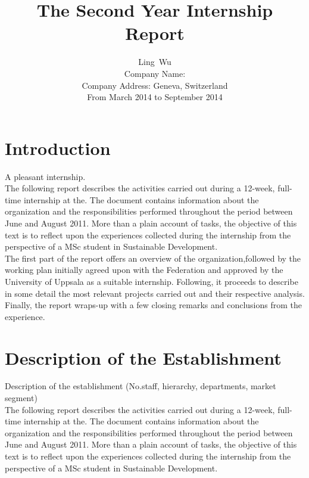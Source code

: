 \documentclass[12pt,onecolumn]{IEEEtran}
\begin{document}
\linespread{1.5}
\title{The Second Year Internship Report}
\author{Ling~Wu\\
  Company Name:\\
  Company Address: Geneva, Switzerland\\
  From March 2014 to September 2014\\}
\maketitle

\IEEEpeerreviewmaketitle
\thispagestyle{empty}
\newpage

\tableofcontents
\thispagestyle{empty}

\newpage

\clearpage
{} 
\section{\textbf{Introduction}}

A pleasant internship.\\

The following report describes the activities carried out during a 12-week, full-time internship at the. The document contains information about the organization and the responsibilities performed throughout the period between June and August 2011. More than a plain account of tasks, the objective of this text is to reflect upon the experiences collected during the internship from the perspective of a MSc student in Sustainable Development.\\

The first part of the report offers an overview of the organization,followed by the working plan initially agreed upon with the Federation and approved by the University of Uppsala as a suitable internship. Following, it proceeds to describe in some detail the most relevant projects carried out and their respective analysis. Finally, the report wraps-up with a few closing remarks and conclusions from the experience.

\newpage
\section{\textbf{Description of the Establishment}}
Description of the establishment (No.staff, hierarchy, departments, market segment)\\

The following report describes the activities carried out during a 12-week, full-time internship at the. The document contains information about the organization and the responsibilities performed throughout the period between June and August 2011. More than a plain account of tasks, the objective of this text is to reflect upon the experiences collected during the internship from the perspective of a MSc student in
Sustainable Development.\\
\end{document}
